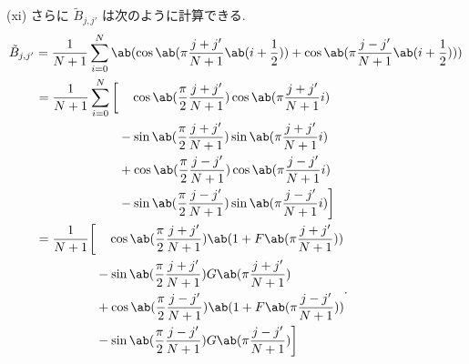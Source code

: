 \documentclass[uplatex,dvipdfmx,a4paper,11pt]{jlreq}
\numberwithin{equation}{section}
\theoremstyle{definition}
\begin{document}
(xi) さらに $\tilde{B}_{j,j'}$ は次のように計算できる.
\begin{align}
  \tilde{B}_{j,j'} & = \frac{1}{N+1}\sum_{i=0}^{N}\ab(\cos\ab(\pi\frac{j + j'}{N+1}\ab(i + \frac{1}{2})) + \cos\ab(\pi\frac{j - j'}{N+1}\ab(i + \frac{1}{2}))) \\
                   & \ \begin{aligned}
                         = \frac{1}{N+1}\sum_{i=0}^{N}\bigg[ & \quad\cos\ab(\frac{\pi}{2}\frac{j + j'}{N+1})\cos\ab(\pi\frac{j + j'}{N+1}i)    \\
                                                             & - \sin\ab(\frac{\pi}{2}\frac{j + j'}{N+1})\sin\ab(\pi\frac{j + j'}{N+1}i)       \\
                                                             & + \cos\ab(\frac{\pi}{2}\frac{j - j'}{N+1})\cos\ab(\pi\frac{j - j'}{N+1}i)       \\
                                                             & - \sin\ab(\frac{\pi}{2}\frac{j - j'}{N+1})\sin\ab(\pi\frac{j - j'}{N+1}i)\bigg]
                       \end{aligned}                                    \\
                   & \ \begin{aligned}
                         = \frac{1}{N+1}\bigg[ & \quad\cos\ab(\frac{\pi}{2}\frac{j + j'}{N+1})\ab(1 + F\ab(\pi\frac{j + j'}{N+1})) \\
                                               & - \sin\ab(\frac{\pi}{2}\frac{j + j'}{N+1})G\ab(\pi\frac{j + j'}{N+1})             \\
                                               & + \cos\ab(\frac{\pi}{2}\frac{j - j'}{N+1})\ab(1 + F\ab(\pi\frac{j - j'}{N+1}))    \\
                                               & - \sin\ab(\frac{\pi}{2}\frac{j - j'}{N+1})G\ab(\pi\frac{j - j'}{N+1})\bigg]
                       \end{aligned}.
\end{align}
\end{document}
